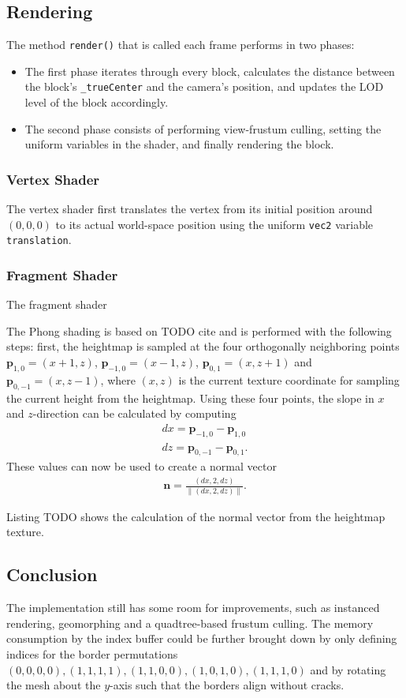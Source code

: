 \subsection{Rendering}
The method \texttt{render()} that is called each frame performs in two phases:
\begin{itemize}
  \item The first phase iterates through every block, calculates the distance between 
        the block's \texttt{\_trueCenter} and the camera's position, and updates the LOD level of the block 
        accordingly. 
  \item The second phase consists of performing view-frustum culling, setting the uniform variables in the shader,
        and finally rendering the block.
\end{itemize}

\subsubsection{Vertex Shader}
The vertex shader first translates the vertex from its initial position around $(0,0,0)$ to its actual world-space 
position using the uniform \texttt{vec2} variable \texttt{translation}.

\subsubsection{Fragment Shader}
The fragment shader 

The Phong shading is based on TODO cite and is performed with the following steps: 
first, the heightmap is sampled at the four orthogonally neighboring points $\mathbf{p}_{1,0} = (x + 1,z)$, $\mathbf{p}_{-1,0} = (x - 1,z)$, $\mathbf{p}_{0,1} = (x, z + 1)$ and $\mathbf{p}_{0,-1} = (x, z - 1)$,
where $(x,z)$ is the current texture coordinate for sampling the current height from the heightmap.
Using these four points, the slope in $x$ and $z$-direction can be calculated by computing
\begin{align*}
  dx = \mathbf{p}_{-1,0} - \mathbf{p}_{1,0}\\
  dz = \mathbf{p}_{0,-1} - \mathbf{p}_{0,1}.
\end{align*}
These values can now be used to create a normal vector
\begin{align*}
  \mathbf{n} = \frac{(dx, 2, dz)}{\lVert(dx,2,dz)\rVert}.
\end{align*}

Listing TODO shows the calculation of the normal vector from the heightmap texture.


\subsection{Conclusion}
The implementation still has some room for improvements, such as instanced rendering, geomorphing 
and a quadtree-based frustum culling. The memory consumption by the index buffer could be 
further brought down by only defining indices for the border permutations $(0,0,0,0),
(1,1,1,1),(1,1,0,0),(1,0,1,0),$$(1,1,1,0)$ and 
by rotating the mesh about the $y$-axis such that the borders align without cracks.
